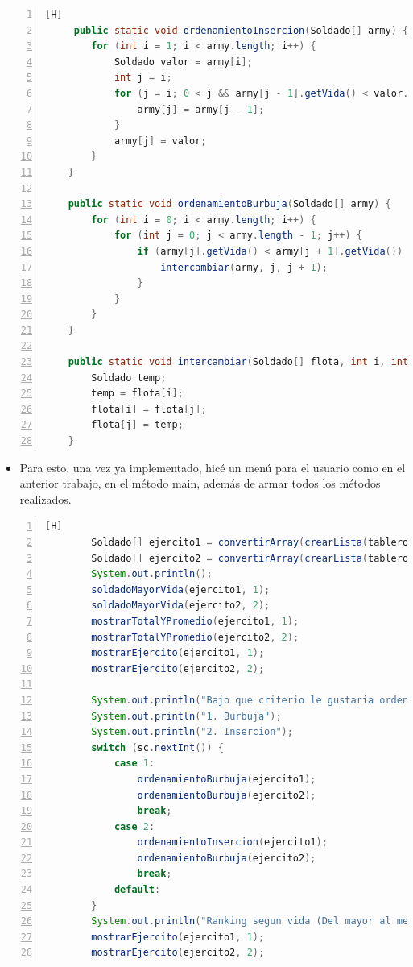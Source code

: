 \documentclass{article}
\begin{document}
	\begin{lstlisting}[language=java,caption={Algoritmos de ordenamiento}, numbers=left][H]
	 public static void ordenamientoInsercion(Soldado[] army) {
        for (int i = 1; i < army.length; i++) {
            Soldado valor = army[i];
            int j = i;
            for (j = i; 0 < j && army[j - 1].getVida() < valor.getVida(); j--) {
                army[j] = army[j - 1];
            }
            army[j] = valor;
        }
    }

    public static void ordenamientoBurbuja(Soldado[] army) {
        for (int i = 0; i < army.length; i++) {
            for (int j = 0; j < army.length - 1; j++) {
                if (army[j].getVida() < army[j + 1].getVida()) {
                    intercambiar(army, j, j + 1);
                }
            }
        }
    }

    public static void intercambiar(Soldado[] flota, int i, int j) {
        Soldado temp;
        temp = flota[i];
        flota[i] = flota[j];
        flota[j] = temp;
    }
	\end{lstlisting}
	\begin{itemize}	
		\item Para esto, una vez ya implementado, hicé un menú para el usuario como en el anterior trabajo, en el método main, además de armar todos los métodos realizados.
	\end{itemize}
	\begin{lstlisting}[language=java,caption={Método main}, numbers=left][H]
	 	Soldado[] ejercito1 = convertirArray(crearLista(tablero, filas1, columnas1));
        Soldado[] ejercito2 = convertirArray(crearLista(tablero, filas2, columnas2));
        System.out.println();
        soldadoMayorVida(ejercito1, 1);
        soldadoMayorVida(ejercito2, 2);
        mostrarTotalYPromedio(ejercito1, 1);
        mostrarTotalYPromedio(ejercito2, 2);
        mostrarEjercito(ejercito1, 1);
        mostrarEjercito(ejercito2, 2);

        System.out.println("Bajo que criterio le gustaria ordenar los ejercitos?");
        System.out.println("1. Burbuja");
        System.out.println("2. Insercion");
        switch (sc.nextInt()) {
            case 1:
                ordenamientoBurbuja(ejercito1);
                ordenamientoBurbuja(ejercito2);
                break;
            case 2:
                ordenamientoInsercion(ejercito1);
                ordenamientoBurbuja(ejercito2);
                break;
            default:
        }
        System.out.println("Ranking segun vida (Del mayor al menor): ");
        mostrarEjercito(ejercito1, 1);
        mostrarEjercito(ejercito2, 2);
	\end{lstlisting}
	
\end{document}
